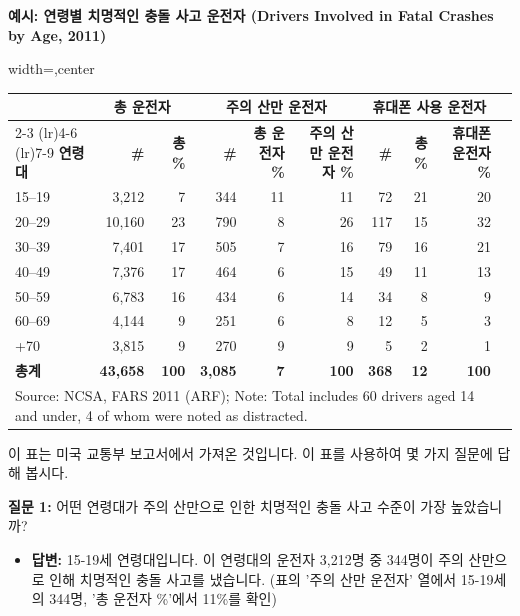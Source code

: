 \documentclass[11pt,a4paper]{article}
\begin{document}
\begin{examplebox}
\textbf{예시: 연령별 치명적인 충돌 사고 운전자 (Drivers Involved in Fatal Crashes by Age, 2011)}

\begin{center}
\label{tab:fatal_crashes}
\begin{adjustbox}{width=\textwidth,center}
\begin{tabular}{lrrrrrrrrr}
\toprule
& \multicolumn{2}{c}{\textbf{총 운전자}} & \multicolumn{3}{c}{\textbf{주의 산만 운전자}} & \multicolumn{3}{c}{\textbf{휴대폰 사용 운전자}} \\
\cmidrule(lr){2-3} \cmidrule(lr){4-6} \cmidrule(lr){7-9}
\textbf{연령대} & \textbf{\#} & \textbf{총 \%} & \textbf{\#} & \textbf{총 운전자 \%} & \textbf{주의 산만 운전자 \%} & \textbf{\#} & \textbf{총 \%} & \textbf{휴대폰 운전자 \%} \\
\midrule
15–19 & 3,212 & 7 & 344 & 11 & 11 & 72 & 21 & 20 \\
20–29 & 10,160 & 23 & 790 & 8 & 26 & 117 & 15 & 32 \\
30–39 & 7,401 & 17 & 505 & 7 & 16 & 79 & 16 & 21 \\
40–49 & 7,376 & 17 & 464 & 6 & 15 & 49 & 11 & 13 \\
50–59 & 6,783 & 16 & 434 & 6 & 14 & 34 & 8 & 9 \\
60–69 & 4,144 & 9 & 251 & 6 & 8 & 12 & 5 & 3 \\
+70 & 3,815 & 9 & 270 & 9 & 9 & 5 & 2 & 1 \\
\midrule
\textbf{총계} & \textbf{43,658} & \textbf{100} & \textbf{3,085} & \textbf{7} & \textbf{100} & \textbf{368} & \textbf{12} & \textbf{100} \\
\bottomrule
\multicolumn{9}{l}{\small Source: NCSA, FARS 2011 (ARF); Note: Total includes 60 drivers aged 14 and under, 4 of whom were noted as distracted.} \\
\end{tabular}
\end{adjustbox}
\end{center}
이 표는 미국 교통부 보고서에서 가져온 것입니다. 이 표를 사용하여 몇 가지 질문에 답해 봅시다.

\textbf{질문 1:} 어떤 연령대가 주의 산만으로 인한 치명적인 충돌 사고 수준이 가장 높았습니까?
\begin{itemize}
    \item \textbf{답변:} 15-19세 연령대입니다. 이 연령대의 운전자 3,212명 중 344명이 주의 산만으로 인해 치명적인 충돌 사고를 냈습니다. (표의 '주의 산만 운전자' 열에서 15-19세의 344명, '총 운전자 \%'에서 11\%를 확인)
\end{itemize}


\end{examplebox}
\end{document}
